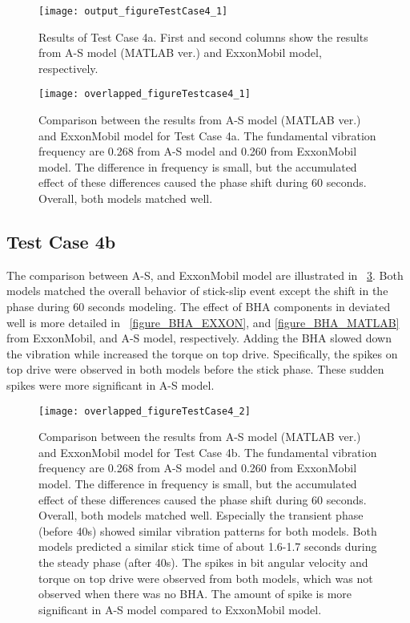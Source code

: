\begin{figure}
  \centering
  \texttt{[image: output\_figureTestCase4\_1]}
  \caption[Results of Test Case 4a]{Results of Test Case 4a. First and second columns show the results from A-S model (MATLAB ver.) and ExxonMobil model, respectively.}\label{figure_testcase4_1}
\end{figure}

\begin{figure}
  \centering
  \texttt{[image: overlapped\_figureTestcase4\_1]}
  \caption[Comparison of the results for Test Case 4a]{Comparison between the results from A-S model (MATLAB ver.) and ExxonMobil model for Test Case 4a. The fundamental vibration frequency are 0.268 from A-S model and 0.260 from ExxonMobil model. The difference in frequency is small, but the accumulated effect of these differences caused the phase shift during 60 seconds. Overall, both models matched well.}\label{figure_testCase4_1_overlapped}
\end{figure}


\subsection{Test Case 4b}
The comparison between A-S, and ExxonMobil model are illustrated in \figurename~\ref{figure_testcase4_2_overlapped}. Both models matched the overall behavior of stick-slip event except the shift in the phase during 60 seconds modeling. The effect of BHA components in deviated well is more detailed in \figurename~\ref{figure_BHA_EXXON}, and \ref{figure_BHA_MATLAB} from ExxonMobil, and A-S model, respectively. Adding the BHA slowed down the vibration while increased the torque on top drive. Specifically, the spikes on top drive were observed in both models before the stick phase. These sudden spikes were more significant in A-S model.


\begin{figure}
  \centering
  \texttt{[image: overlapped\_figureTestCase4\_2]}
  \caption[Comparison of the results for Test Case 4b]{Comparison between the results from A-S model (MATLAB ver.) and ExxonMobil model for Test Case 4b. The fundamental vibration frequency are 0.268 from A-S model and 0.260 from ExxonMobil model. The difference in frequency is small, but the accumulated effect of these differences caused the phase shift during 60 seconds. Overall, both models matched well. Especially the transient phase (before 40s) showed similar vibration patterns for both models. Both models predicted a similar stick time of about 1.6-1.7 seconds during the steady phase (after 40s). The spikes in bit angular velocity and torque on top drive were observed from both models, which was not observed when there was no BHA. The amount of spike is more significant in A-S model compared to ExxonMobil model.}\label{figure_testcase4_2_overlapped}
\end{figure}

